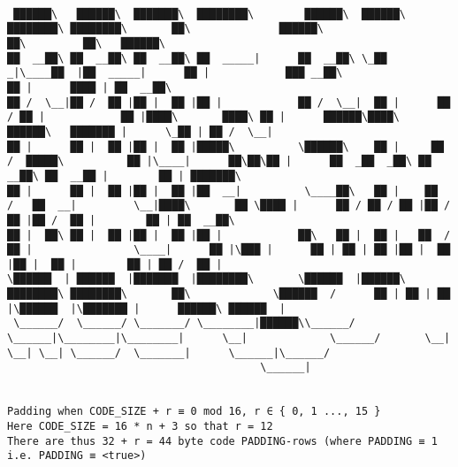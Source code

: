 \documentclass[varwidth=\maxdimen,margin=0.5cm,multi={verbatim}]{standalone}
\begin{document}
\begin{verbatim}

 ██████\   ██████\  ███████\  ████████\        ██████\  ██████\ ████████\ ████████\       ██\              ██████\                                      ██\         ██\   ██████\
██  __██\ ██  __██\ ██  __██\ ██  _____|      ██  __██\ \_██  _|\____██  |██  _____|      ██ |            ███ __██\                                     ██ |      ████ | ██  __██\
██ /  \__|██ /  ██ |██ |  ██ |██ |            ██ /  \__|  ██ |      ██  / ██ |            ██ |████\       ████\ ██ |      ██████\████\   ██████\   ███████ |      \_██ | ██ /  \__|
██ |      ██ |  ██ |██ |  ██ |█████\          \██████\    ██ |     ██  /  █████\          ██ |\____|      ██\██\██ |      ██  _██  _██\ ██  __██\ ██  __██ |        ██ | ███████\
██ |      ██ |  ██ |██ |  ██ |██  __|          \____██\   ██ |    ██  /   ██  __|         \__|████\       ██ \████ |      ██ / ██ / ██ |██ /  ██ |██ /  ██ |        ██ | ██  __██\
██ |  ██\ ██ |  ██ |██ |  ██ |██ |            ██\   ██ |  ██ |   ██  /    ██ |                \____|      ██ |\███ |      ██ | ██ | ██ |██ |  ██ |██ |  ██ |        ██ | ██ /  ██ |
\██████  | ██████  |███████  |████████\       \██████  |██████\ ████████\ ████████\       ██\             \██████  /      ██ | ██ | ██ |\██████  |\███████ |      ██████\ ██████  |
 \______/  \______/ \_______/ \________|██████\\______/ \______|\________|\________|      \__|             \______/       \__| \__| \__| \______/  \_______|      \______|\______/
                                        \______|


Padding when CODE_SIZE + r ≡ 0 mod 16, r ∈ { 0, 1 ..., 15 }
Here CODE_SIZE = 16 * n + 3 so that r = 12
There are thus 32 + r = 44 byte code PADDING-rows (where PADDING ≡ 1 i.e. PADDING ≡ <true>)


\end{verbatim}
\end{document}
